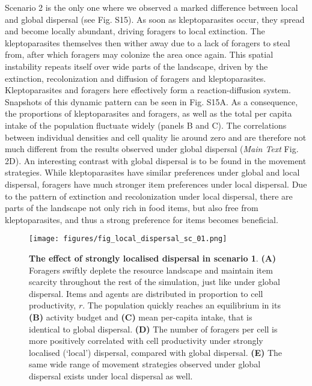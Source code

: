 \documentclass[]{article}
\begin{document}
Scenario 2 is the only one where we observed a marked difference between local and global dispersal (see Fig. S15). As soon as kleptoparasites occur, they spread and become locally abundant, driving foragers to local extinction. The kleptoparasites themselves then wither away due to a lack of foragers to steal from, after which foragers may colonize the area once again. This spatial instability repeats itself over wide parts of the landscape, driven by the extinction, recolonization and diffusion of foragers and kleptoparasites. Kleptoparasites and foragers here effectively form a reaction-diffusion system. Snapshots of this dynamic pattern can be seen in Fig. S15A. As a consequence, the proportions of kleptoparasites and foragers, as well as the total per capita intake of the population fluctuate widely (panels B and C). The correlations between individual densities and cell quality lie around zero and are therefore not much different from the results observed under global dispersal (\emph{Main Text} Fig. 2D). An interesting contrast with global dispersal is to be found in the movement strategies. While kleptoparasites have similar preferences under global and local dispersal, foragers have much stronger item preferences under local dispersal. Due to the pattern of extinction and recolonization under local dispersal, there are parts of the landscape not only rich in food items, but also free from kleptoparasites, and thus a strong preference for items becomes beneficial.

\begin{figure}
\centering
\texttt{[image: figures/fig\_local\_dispersal\_sc\_01.png]}
\caption{\textbf{The effect of strongly localised dispersal in scenario 1}. \textbf{(A)} Foragers swiftly deplete the resource landscape and maintain item scarcity throughout the rest of the simulation, just like under global dispersal. Items and agents are distributed in proportion to cell productivity, \(r\). The population quickly reaches an equilibrium in its \textbf{(B)} activity budget and \textbf{(C)} mean per-capita intake, that is identical to global dispersal. \textbf{(D)} The number of foragers per cell is more positively correlated with cell productivity under strongly localised (`local') dispersal, compared with global dispersal. \textbf{(E)} The same wide range of movement strategies observed under global dispersal exists under local dispersal as well.}
\end{figure}
\end{document}
